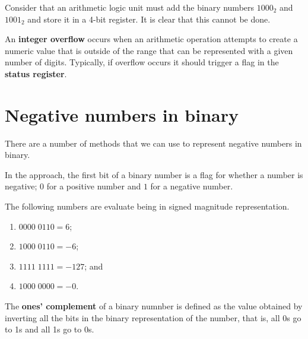 \begin{example}
    Consider that an arithmetic logic unit must add the binary numbers $1000_2$ and $1001_2$ and store it in a 4-bit register. It is clear that this cannot be done.
\end{example}

\begin{definition}
    An \textbf{integer overflow} occurs when an arithmetic operation attempts to create a numeric value that is outside of the range that can be represented with a given number of digits. Typically, if overflow occurs it should trigger a flag in the \textbf{status register}.
\end{definition}

\section{Negative numbers in binary}

There are a number of methods that we can use to represent negative numbers in binary.

\begin{definition}
    In the approach, the first bit of a binary number is a flag for whether a number is negative; $0$ for a positive number and $1$ for a negative number.
\end{definition}

\begin{example}
    The following numbers are evaluate being in signed magnitude representation.
    \begin{enumerate}
        \item $0000 \; 0110 = 6$;
        \item $1000 \; 0110 = -6$;
        \item $1111 \; 1111 = -127$; and
        \item $1000 \; 0000 = -0$.
    \end{enumerate}
\end{example}

\begin{definition}
    The \textbf{ones' complement} of a binary numnber is defined as the value obtained by inverting all the bits in the binary representation of the number, that is, all 0s go to 1s and all 1s go to 0s.
\end{definition}

